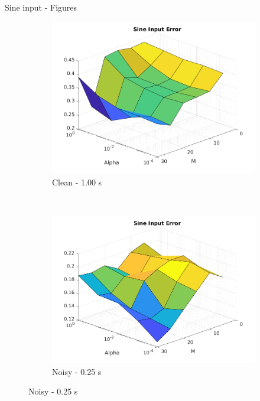 \documentclass{beamer}
\begin{document}
\begin{frame}{Sine input - Figures}
\begin{figure}
\begin{subfigure}[b]{0.3\textwidth}
        \end{subfigure}
        \hfill
        \begin{subfigure}[b]{0.3\textwidth}
            \centering
            \includegraphics[width=\textwidth]{Figures_Clean/figure_sine_T_1.00.png}
            \caption{Clean - 1.00 s}
            \label{fig:clean_sine_100}
        \end{subfigure}
        \\
        \begin{subfigure}[b]{0.3\textwidth}
            \centering
            \includegraphics[width=\textwidth]{Figures_Noisy/figure_sine_T_0.25.png}
            \caption{Noisy - 0.25 s}
            \label{fig:noisy_sine_025}
        \end{subfigure}

\end{figure}
\end{frame}
\end{document}

